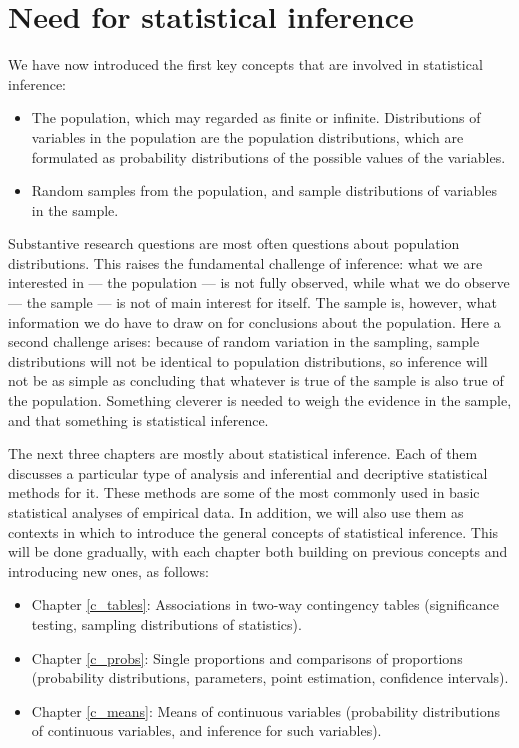 \section{Need for statistical inference}
\label{s_samples_inference}

We have now introduced the first key concepts that are involved in statistical
inference:
\begin{itemize}
\item
The population, which may regarded as finite or infinite. Distributions
of variables in the population are the population distributions, which
are formulated as probability distributions of the possible values of
the variables.
\item
Random samples from the population, and sample distributions of
variables in the sample.
\end{itemize}
Substantive research questions are most often questions about population
distributions. This raises the fundamental challenge of inference: what
we are interested in --- the population --- is not fully observed, while
what we do observe --- the sample --- is not of main interest for
itself. The sample is, however, what information we do have to draw on
for conclusions about the population. Here a second challenge arises:
because of random variation in the sampling, sample distributions will
not be identical to population distributions, so inference will not be
as simple as concluding that whatever is true of the sample is also true
of the population. Something cleverer is needed to weigh the evidence in
the sample, and that something is statistical inference.

The next three chapters are mostly about statistical inference. Each of
them discusses a particular type of analysis and inferential and
decriptive statistical methods for it. These methods are some of the
most commonly used in basic statistical analyses of empirical data. In
addition, we will also use them as contexts in which to introduce the
general concepts of statistical inference. This will be done gradually,
with each chapter both building on previous concepts and introducing new
ones, as follows:
\begin{itemize}
\item
Chapter \ref{c_tables}: Associations in two-way contingency tables
(significance testing, sampling distributions of statistics).
\item
Chapter \ref{c_probs}: Single proportions and comparisons of
proportions (probability distributions, parameters, point estimation, confidence
intervals).
\item
Chapter \ref{c_means}: Means of continuous variables (probability distributions
of continuous variables, and inference for such variables).
\end{itemize}
